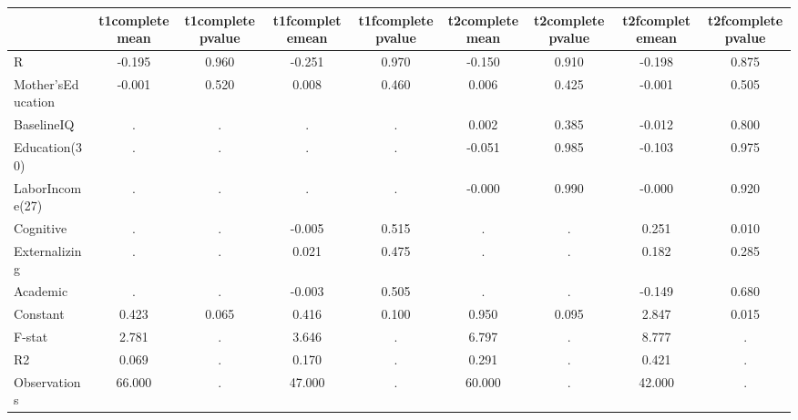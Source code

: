 \begin{table}[htbp]
\begin{tabular}{lcccccccc} \hline \hline
 & t1completemean  & t1completepvalue  & t1fcompletemean  & t1fcompletepvalue  & t2completemean  & t2completepvalue  & t2fcompletemean  & t2fcompletepvalue  \\  \hline 
R &    -0.195 &     0.960 &    -0.251 &     0.970 &    -0.150 &     0.910 &    -0.198 &     0.875 \\  
Mother'sEducation &    -0.001 &     0.520 &     0.008 &     0.460 &     0.006 &     0.425 &    -0.001 &     0.505 \\  
BaselineIQ &         . &         . &         . &         . &     0.002 &     0.385 &    -0.012 &     0.800 \\  
Education(30) &         . &         . &         . &         . &    -0.051 &     0.985 &    -0.103 &     0.975 \\  
LaborIncome(27) &         . &         . &         . &         . &    -0.000 &     0.990 &    -0.000 &     0.920 \\  
Cognitive &         . &         . &    -0.005 &     0.515 &         . &         . &     0.251 &     0.010 \\  
Externalizing &         . &         . &     0.021 &     0.475 &         . &         . &     0.182 &     0.285 \\  
Academic &         . &         . &    -0.003 &     0.505 &         . &         . &    -0.149 &     0.680 \\  
Constant &     0.423 &     0.065 &     0.416 &     0.100 &     0.950 &     0.095 &     2.847 &     0.015 \\  
F-stat &     2.781 &         . &     3.646 &         . &     6.797 &         . &     8.777 &         . \\  
R2 &     0.069 &         . &     0.170 &         . &     0.291 &         . &     0.421 &         . \\  
Observations &    66.000 &         . &    47.000 &         . &    60.000 &         . &    42.000 &         . \\  
\hline \hline \end{tabular}
\end{table}
